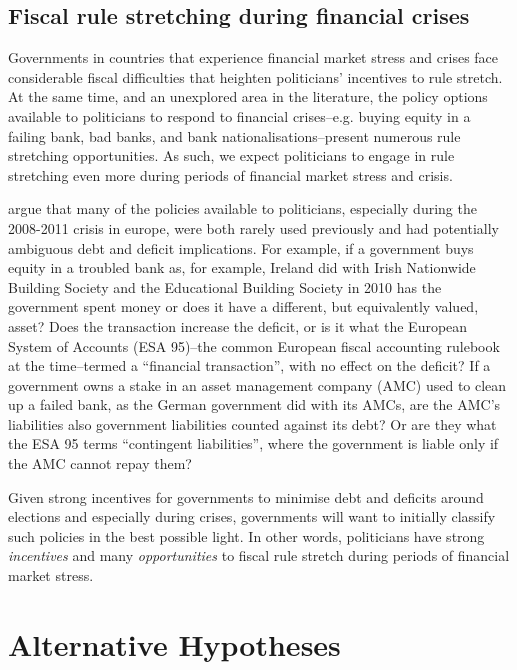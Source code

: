 \documentclass[]{article}
\begin{document}
\subsection{Fiscal rule stretching during financial crises}

Governments in countries that experience financial market stress and crises face considerable fiscal difficulties \cite[see][]{Laeven2012} that heighten politicians' incentives to rule stretch. At the same time, and an unexplored area in the literature, the policy options available to politicians to respond to financial crises--e.g. buying equity in a failing bank, bad banks, and bank nationalisations--present numerous rule stretching opportunities. As such, we expect politicians to engage in rule stretching even more during periods of financial market stress and crisis.

\cite{GandrudHallerberg2016} argue that many of the policies available to politicians, especially during the 2008-2011 crisis in europe, were both rarely used previously and had potentially ambiguous debt and deficit implications. For example, if a government buys equity in a troubled bank as, for example, Ireland did with Irish Nationwide Building Society and the Educational Building Society in 2010 has the government spent money or does it have a different, but equivalently valued, asset? Does the transaction increase the deficit, or is it what the European System of Accounts (ESA 95)--the common European fiscal accounting rulebook at the time--termed a ``financial transaction'', with no effect on the deficit? If a government owns a stake in an asset management company (AMC) used to clean up a failed bank, as the German government did with its AMCs, are the AMC's liabilities also government liabilities counted against its debt? Or are they what the ESA 95 terms ``contingent liabilities'', where the government is liable only if the AMC cannot repay them?

Given strong incentives for governments to minimise debt and deficits around elections and especially during crises, governments will want to initially classify such policies in the best possible light. In other words, politicians have strong \emph{incentives} and many \emph{opportunities} to fiscal rule stretch during periods of financial market stress.

\section{Alternative Hypotheses}
\end{document}
